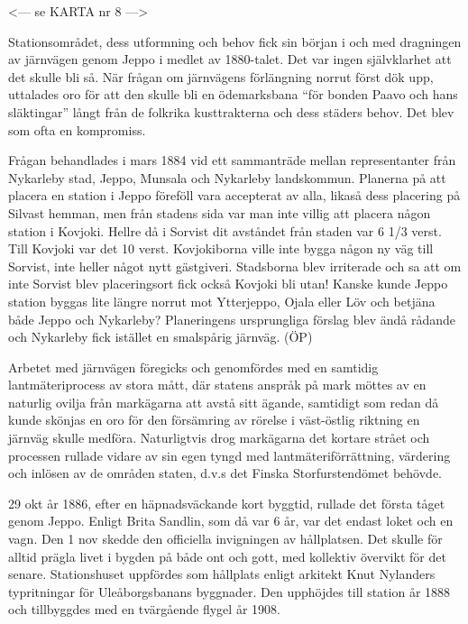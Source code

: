 
<--- se KARTA nr 8 --->






Stationsområdet, dess utformning och behov fick sin början i och med dragningen av järnvägen genom Jeppo i medlet av 1880-talet. Det var ingen självklarhet att det skulle bli så. När frågan om järnvägens förlängning norrut först dök upp, uttalades oro för att den skulle bli en ödemarksbana ``för bonden Paavo och hans släktingar'' långt från de folkrika kusttrakterna och dess städers behov. Det blev som ofta en kompromiss.

Frågan behandlades i mars 1884 vid ett sammanträde mellan representanter från Nykarleby stad, Jeppo, Munsala och Nykarleby landskommun. Planerna på att placera en station i Jeppo föreföll vara accepterat av alla, likaså dess placering på Silvast hemman, men från stadens sida var man inte villig att placera någon station i Kovjoki. Hellre då i Sorvist dit avståndet från staden var 6 1/3 verst. Till Kovjoki var det 10 verst. Kovjokiborna ville inte bygga någon ny väg till Sorvist, inte heller något nytt gästgiveri. Stadsborna blev irriterade och sa att om inte Sorvist blev placeringsort fick också Kovjoki bli utan! Kanske kunde Jeppo station byggas lite längre norrut mot Ytterjeppo, Ojala eller Löv och betjäna både Jeppo och Nykarleby? Planeringens ursprungliga förslag blev ändå rådande och Nykarleby fick istället en smalspårig järnväg. (ÖP)

Arbetet med järnvägen föregicks och genomfördes med en samtidig lantmäteriprocess av stora mått, där statens anspråk på mark möttes av en naturlig ovilja från markägarna att avstå sitt ägande, samtidigt som redan då kunde skönjas en oro för den försämring av rörelse i väst-östlig riktning en järnväg skulle medföra. Naturligtvis drog markägarna det kortare strået och processen rullade vidare av sin egen tyngd med lantmäteriförrättning, värdering och inlösen av de områden staten, d.v.s det Finska Storfurstendömet behövde.

29 okt år 1886, efter en häpnadsväckande kort byggtid, rullade det första tåget genom Jeppo. Enligt Brita Sandlin, som då var 6 år, var det endast loket och en vagn. Den 1 nov skedde den officiella invigningen av hållplatsen. Det skulle för alltid prägla livet i bygden på både ont och gott, med kollektiv övervikt för det senare. Stationshuset uppfördes som hållplats enligt arkitekt Knut Nylanders typritningar för Uleåborgsbanans byggnader. Den upphöjdes till station år 1888 och tillbyggdes med en tvärgående flygel år 1908.

